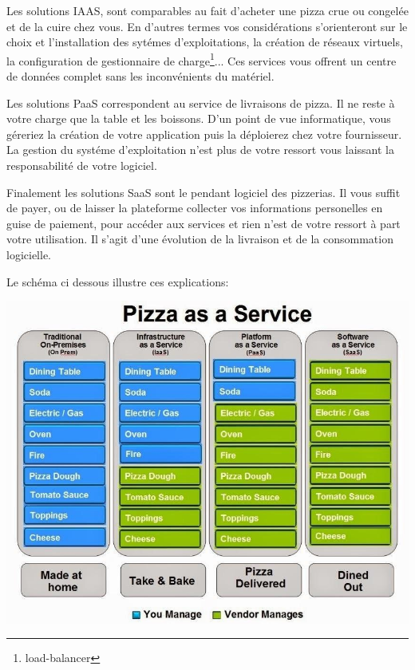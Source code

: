 \documentclass[11pt, a4paper ]{article}
\begin{document}
\begin{spacing}{1.5}
Les solutions IAAS, sont comparables au fait d'acheter une pizza crue ou congelée et de la cuire chez vous. En d'autres termes vos considérations s'orienteront sur le choix et l'installation des sytémes d'exploitations, la création de réseaux virtuels, la configuration de gestionnaire de charge\footnote{load-balancer}... Ces services vous offrent un centre de données complet sans les inconvénients du matériel.

Les solutions PaaS correspondent au service de livraisons de pizza. Il ne reste à votre charge que la table et les boissons. D'un point de vue informatique, vous géreriez la création de votre application puis la déploierez chez votre fournisseur. La gestion du systéme d'exploitation n'est plus de votre ressort vous laissant la responsabilité de votre logiciel.

Finalement les solutions SaaS sont le pendant logiciel des pizzerias. Il vous suffit de payer, ou de laisser la plateforme collecter vos informations personelles en guise de paiement, pour accéder aux services et rien n'est de votre ressort à part votre utilisation. Il s'agit d'une évolution de la livraison et de la consommation logicielle.

Le schéma ci dessous illustre ces explications:

\includegraphics[width=\textwidth]{images/PizzaasaService.jpg}



\end{spacing}
\end{document}
